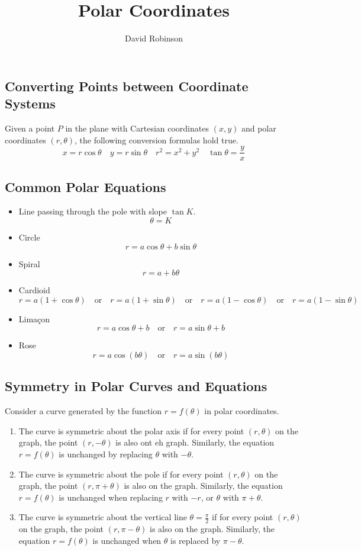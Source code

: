 \documentclass{article}
\title{Polar Coordinates}
\author{David Robinson}
\date{}
\begin{document}
\maketitle

\subsection*{Converting Points between Coordinate Systems}
Given a point $P$ in the plane with Cartesian coordinates $(x,y)$ and polar coordinates $(r,\theta)$, the following conversion formulas hold true.
\[x=r\cos\theta\quad y=r\sin\theta\quad r^2=x^2+y^2\quad \tan\theta =\frac{y}{x}\]

\subsection*{Common Polar Equations}

\begin{itemize}
    \item Line passing through the pole with slope $\tan K$.
    \[\theta =K\]
    \item Circle
    \[r=a\cos\theta +b\sin\theta\]
    \item Spiral
    \[r=a+b\theta\]
    \item Cardioid
    \[r=a(1+\cos\theta)\quad\text{or}\quad r=a(1+\sin\theta)\quad\text{or}\quad r=a(1-\cos\theta)\quad\text{or}\quad r=a(1-\sin\theta)\]
    \item Limaçon
    \[r=a\cos\theta + b\quad\text{or}\quad r=a\sin\theta + b\]
    \item Rose
    \[r=a\cos(b\theta)\quad\text{or}\quad r=a\sin(b\theta)\]
\end{itemize}

\subsection*{Symmetry in Polar Curves and Equations}
Consider a curve generated by the function $r=f(\theta)$ in polar coordinates.
\begin{enumerate}
    \item The curve is symmetric about the polar axis if for every point $(r,\theta)$ on the graph, the point $(r,-\theta)$ is also ont eh graph. Similarly, the equation $r=f(\theta)$ is unchanged by replacing $\theta$ with $-\theta$.
    \item The curve is symmetric about the pole if for every point $(r,\theta)$ on the graph, the point $(r,\pi +\theta)$ is also on the graph. Similarly, the equation $r=f(\theta)$ is unchanged when replacing $r$ with $-r$, or $\theta$ with $\pi +\theta$.
    \item The curve is symmetric about the vertical line $\theta=\frac{\pi}{2}$ if for every point $(r,\theta)$ on the graph, the point $(r,\pi -\theta)$ is also on the graph. Similarly, the equation $r=f(\theta)$ is unchanged when $\theta$ is replaced by $\pi -\theta$.
\end{enumerate}
\end{document}
